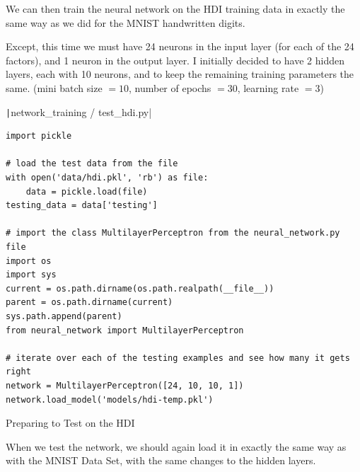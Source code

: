 \documentclass[12pt]{report}
\newcommand{\pil}[1]{\protect\texttt|#1|}
\begin{document}
We can then train the neural network on the HDI training data in exactly the same way as we did for the MNIST handwritten digits.

Except, this time we must have 24 neurons in the input layer (for each of the 24 factors), and 1 neuron in the output layer. I initially decided to have 2 hidden layers, each with 10 neurons, and to keep the remaining training parameters the same. (mini batch size $=10$, number of epochs $=30$, learning rate $=3$)

\begin{center}
\end{center}

\begin{listing}[H]
\pil{network_training / test_hdi.py}
\begin{verbatim}
import pickle

# load the test data from the file
with open('data/hdi.pkl', 'rb') as file:
    data = pickle.load(file)
testing_data = data['testing']

# import the class MultilayerPerceptron from the neural_network.py file
import os
import sys
current = os.path.dirname(os.path.realpath(__file__))
parent = os.path.dirname(current)
sys.path.append(parent)
from neural_network import MultilayerPerceptron

# iterate over each of the testing examples and see how many it gets right
network = MultilayerPerceptron([24, 10, 10, 1])
network.load_model('models/hdi-temp.pkl')
\end{verbatim}
\caption{Preparing to Test on the HDI}\label{cs:preTestHDI}
\end{listing}

When we test the network, we should again load it in exactly the same way as with the MNIST Data Set, with the same changes to the hidden layers.
\end{document}
